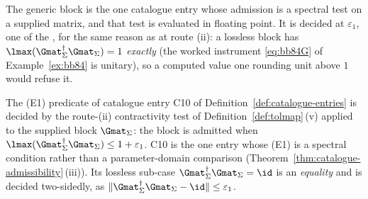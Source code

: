 
The generic block is the one catalogue entry whose admission is a spectral
test on a supplied matrix, and that test is evaluated in floating point. It
is decided at $\varepsilon_1$, one of the , for the
same reason as at route (ii): a lossless block has
$\lmax(\Gmat_\Sigma^\dagger\Gmat_\Sigma)=1$ \emph{exactly} (the worked
instrument \eqref{eq:bb84G} of Example~\ref{ex:bb84} is unitary), so a
computed value one rounding unit above $1$ would refuse it.

\begin{definition}
\label{def:c10-tolerance}
The (E1) predicate of catalogue entry C10 of
Definition~\ref{def:catalogue-entries} is decided by the route-(ii)
contractivity test of Definition~\ref{def:tolmap}\,(v) applied to the supplied
block $\Gmat_\Sigma$: the block is admitted when
$\lmax(\Gmat_\Sigma^\dagger\Gmat_\Sigma)\le1+\varepsilon_1$. C10 is the one
entry whose (E1) is a spectral condition rather than a parameter-domain
comparison (Theorem~\ref{thm:catalogue-admissibility}\,(iii)). Its lossless
sub-case $\Gmat_\Sigma^\dagger\Gmat_\Sigma=\id$ is an \emph{equality} and is
decided two-sidedly, as
$\lVert\Gmat_\Sigma^\dagger\Gmat_\Sigma-\id\rVert\le\varepsilon_1$.
\end{definition}
